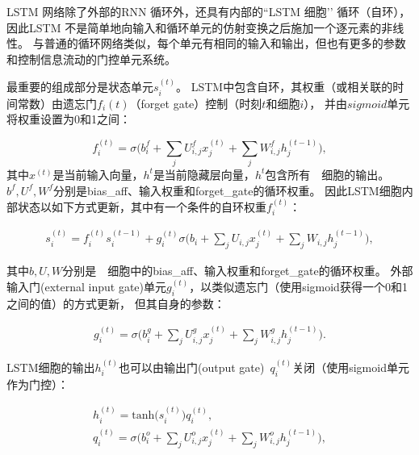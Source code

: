 LSTM 网络除了外部的RNN 循环外，还具有内部的“LSTM 细胞’’ 循环（自环），
因此LSTM 不是简单地向输入和循环单元的仿射变换之后施加一个逐元素的非线性。
与普通的循环网络类似，每个单元有相同的输入和输出，但也有更多的参数和控制信息流动的门控单元系统。

最重要的组成部分是状态单元$s_i^{(t)}$。
LSTM中包含自环，其权重（或相关联的时间常数）由遗忘门$f_i{(t)}$（forget gate）控制（时刻$t$和细胞$i$），
并由$sigmoid$单元将权重设置为0和1之间：\par
\begin{equation}
f_i^{(t)} = \sigma \Big( b_i^f + \sum_j U_{i,j}^f x_j^{(t)} + \sum_j W_{i,j}^f h_j^{(t-1)} \Big),
\end{equation}
其中$x^{(t)}$是当前输入向量，$h^{t}$是当前隐藏层向量，$h^{t}$包含所有~~细胞的输出。 
$b^f, U^f, W^f$分别是\gls{bias_aff}、输入权重和\gls{forget_gate}的循环权重。
因此LSTM细胞内部状态以如下方式更新，其中有一个条件的自环权重$f_i^{(t)}$：\par
\begin{equation}
	\begin{aligned}
		s_i^{(t)} = f_i^{(t)}  s_i^{(t-1)} +  g_i^{(t)}
		\sigma \Big( b_i + \sum_j U_{i,j} x_j^{(t)} + \sum_j W_{i,j} h_j^{(t-1)} \Big),
	\end{aligned}
\end{equation}

其中$b, U, W$分别是~~细胞中的\gls{bias_aff}、输入权重和\gls{forget_gate}的循环权重。
外部输入门(external input gate)单元$g_i^{(t)}$，以类似遗忘门（使用sigmoid获得一个0和1之间的值）的方式更新，
但其自身的参数：\par

\begin{equation}
	\begin{aligned}
	g_i^{(t)} = \sigma \Big( b_i^g + \sum_j U_{i,j}^g x_j^{(t)} + \sum_j W_{i,j}^g h_j^{(t-1)} \Big).
	\end{aligned}
\end{equation}

LSTM细胞的输出$h_i^{(t)}$也可以由输出门(output gate)~$q_i^{(t)}$关闭（使用sigmoid单元作为门控）：\par
\begin{equation}
	\begin{gathered}
		h_i^{(t)} = \text{tanh}\big( s_i^{(t)} \big) q_i^{(t)}, \\
		q_i^{(t)} = \sigma \Big( b_i^o + \sum_j U_{i,j}^o x_j^{(t)} + \sum_j W_{i,j}^o h_j^{(t-1)} \Big),
	\end{gathered}
\end{equation}


